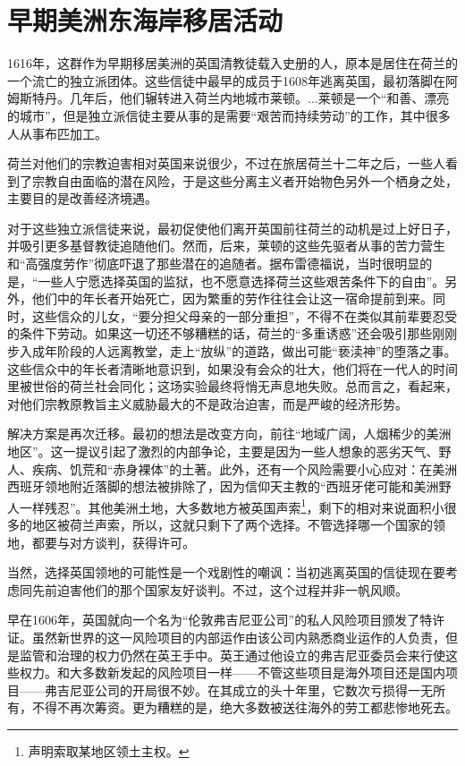 \documentclass[12pt,oneside]{book}
\begin{document}
\chapter{早期美洲东海岸移居活动}

\begin{bookref}[frametitle={\cite{美国四百年}}]
1616年，这群作为早期移居美洲的英国清教徒载入史册的人，原本是居住在荷兰的一个流亡的独立派团体。这些信徒中最早的成员于1608年逃离英国，最初落脚在阿姆斯特丹。几年后，他们辗转进入荷兰内地城市莱顿。...莱顿是一个“和善、漂亮的城市”，但是独立派信徒主要从事的是需要“艰苦而持续劳动”的工作，其中很多人从事布匹加工。

荷兰对他们的宗教迫害相对英国来说很少，不过在旅居荷兰十二年之后，一些人看到了宗教自由面临的潜在风险，于是这些分离主义者开始物色另外一个栖身之处，主要目的是改善经济境遇。

对于这些独立派信徒来说，最初促使他们离开英国前往荷兰的动机是过上好日子，并吸引更多基督教徒追随他们。然而，后来，莱顿的这些先驱者从事的苦力营生和“高强度劳作”彻底吓退了那些潜在的追随者。据布雷德福说，当时很明显的是，“一些人宁愿选择英国的监狱，也不愿意选择荷兰这些艰苦条件下的自由”。另外，他们中的年长者开始死亡，因为繁重的劳作往往会让这一宿命提前到来。同时，这些信众的儿女，“要分担父母亲的一部分重担”，不得不在类似其前辈要忍受的条件下劳动。如果这一切还不够糟糕的话，荷兰的“多重诱惑”还会吸引那些刚刚步入成年阶段的人远离教堂，走上“放纵”的道路，做出可能“亵渎神”的堕落之事。这些信众中的年长者清晰地意识到，如果没有会众的壮大，他们将在一代人的时间里被世俗的荷兰社会同化；这场实验最终将悄无声息地失败。总而言之，看起来，对他们宗教原教旨主义威胁最大的不是政治迫害，而是严峻的经济形势。

解决方案是再次迁移。最初的想法是改变方向，前往“地域广阔，人烟稀少的美洲地区”。这一提议引起了激烈的内部争论，主要是因为一些人想象的恶劣天气、野人、疾病、饥荒和“赤身裸体”的土著。此外，还有一个风险需要小心应对：在美洲西班牙领地附近落脚的想法被排除了，因为信仰天主教的“西班牙佬可能和美洲野人一样残忍”。其他美洲土地，大多数地方被英国声索\footnote{声明索取某地区领土主权。}，剩下的相对来说面积小很多的地区被荷兰声索，所以，这就只剩下了两个选择。不管选择哪一个国家的领地，都要与对方谈判，获得许可。

当然，选择英国领地的可能性是一个戏剧性的嘲讽：当初逃离英国的信徒现在要考虑同先前迫害他们的那个国家友好谈判。不过，这个过程并非一帆风顺。

早在1606年，英国就向一个名为“伦敦弗吉尼亚公司”的私人风险项目颁发了特许证。虽然新世界的这一风险项目的内部运作由该公司内熟悉商业运作的人负责，但是监管和治理的权力仍然在英王手中。英王通过他设立的弗吉尼亚委员会来行使这些权力。和大多数新发起的风险项目一样——不管这些项目是海外项目还是国内项目——弗吉尼亚公司的开局很不妙。在其成立的头十年里，它数次亏损得一无所有，不得不再次筹资。更为糟糕的是，绝大多数被送往海外的劳工都悲惨地死去。


\end{bookref}
\end{document}
